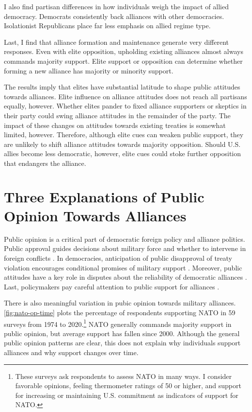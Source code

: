 \documentclass[12pt]{article}
\begin{document}
I also find partisan differences in how individuals weigh the impact of allied democracy. 
Democrats consistently back alliances with other democracies. 
Isolationist Republicans place far less emphasis on allied regime type. 


Last, I find that alliance formation and maintenance generate very different responses.
Even with elite opposition, upholding existing alliances almost always commands majority support. 
Elite support or opposition can determine whether forming a new alliance has majority or minority support. 


The results imply that elites have substantial latitude to shape public attitudes towards alliances. 
Elite influence on alliance attitudes does not reach all partisans equally, however. 
Whether elites pander to fixed alliance supporters or skeptics in their party could swing alliance attitudes in the remainder of the party. 
The impact of these changes on attitudes towards existing treaties is somewhat limited, however. 
Therefore, although elite cues can weaken public support, they are unlikely to shift alliance attitudes towards majority opposition. 
Should U.S. allies become less democratic, however, elite cues could stoke further opposition that endangers the alliance. 




\section{Three Explanations of Public Opinion Towards Alliances}

Public opinion is a critical part of democratic foreign policy and alliance politics.
Public approval guides decisions about military force and whether to intervene in foreign conflicts \citep{Tomzetal2020, LinGreenberg2021}. 
In democracies, anticipation of public disapproval of treaty violation encourages conditional promises of military support \citep{Chibaetal2015, FjelstulReiter2019}. 
Moreover, public attitudes have a key role in disputes about the reliability of democratic alliances \citep{Gaubatz1996, GartzkeGleditsch2004}. 
Last, policymakers pay careful attention to public support for alliances \citep{Sayle2019}. 


There is also meaningful variation in pubic opinion towards military alliances. 
\autoref{fig:nato-op-time} plots the percentage of respondents supporting NATO in 59 surveys from 1974 to 2020.\footnote{These surveys ask respondents to assess NATO in many ways. I consider favorable opinions, feeling thermometer ratings of 50 or higher, and support for increasing or maintaining U.S. commitment as indicators of support for NATO.} 
NATO generally commands majority support in public opinion, but average support has fallen since 2000. 
Although the general public opinion patterns are clear, this does not explain why individuals support alliances and why support changes over time. 
\end{document}
